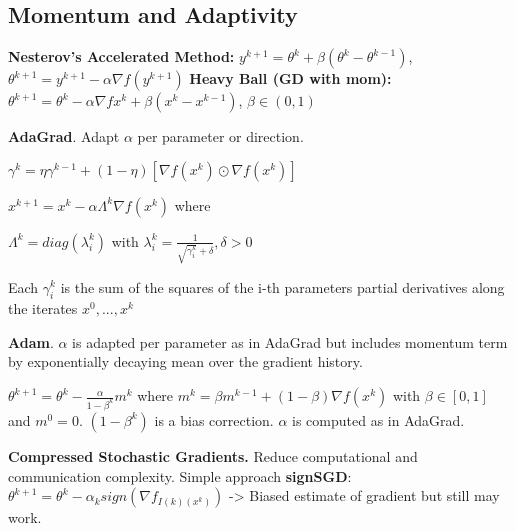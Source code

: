 \subsection*{Momentum and Adaptivity}
\textbf{Nesterov's Accelerated Method: } $y^{k+1}=\theta^k + \beta(\theta^{k}-\theta^{k-1})$, $\theta^{k+1} = y^{k+1}-\alpha\nabla f(y^{k+1})$
\textbf{Heavy Ball (GD with mom): }$\theta^{k+1} = \theta^{k} - \alpha\nabla fx^k + \beta (x^k - x^{k-1})$, $\beta\in(0,1)$

\textbf{AdaGrad}. Adapt $\alpha$ per parameter or direction.

$\gamma^k = \eta\gamma^{k-1} + (1-\eta)[\nabla f(x^k) \odot \nabla f(x^k)]$

$x^{k+1} = x^k - \alpha\Lambda^k\nabla f(x^k)$ where

$\Lambda^k = diag(\lambda_i^k)$ with $\lambda_i^k = \frac{1}{\sqrt{\gamma_i^k} + \delta}, \delta>0$

Each $\gamma_i^k$ is the sum of the squares of the i-th parameters partial derivatives along the iterates $x^0, ..., x^k$

\textbf{Adam}. $\alpha$ is adapted per parameter as in AdaGrad but includes momentum term by exponentially decaying mean over the gradient history.

$\theta^{k+1} = \theta^k - \frac{\alpha}{1-\beta^k}m^k$ where $m^k = \beta m^{k-1} + (1-\beta)\nabla f(x^k)$ with $\beta\in[0,1]$ and $m^0=0$.
$(1-\beta^k)$ is a bias correction. $\alpha$ is computed as in AdaGrad.

\textbf{Compressed Stochastic Gradients.} Reduce computational and communication complexity. Simple approach \textbf{signSGD}:
$\theta^{k+1}=\theta^{k}-\alpha_ksign(\nabla f_{I(k)(x^k)})$ -> Biased estimate of gradient but still may work.